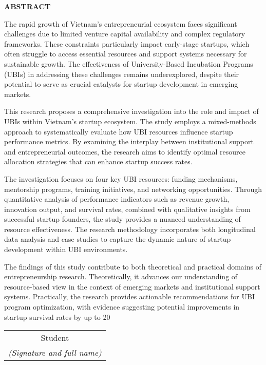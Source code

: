\documentclass[../DoAn.tex]{subfiles}
\begin{document}
	\begin{center}
		\Large{\textbf{ABSTRACT}}\\
	\end{center}
	\vspace{1cm}
	The rapid growth of Vietnam's entrepreneurial ecosystem faces significant challenges due to limited venture capital availability and complex regulatory frameworks. These constraints particularly impact early-stage startups, which often struggle to access essential resources and support systems necessary for sustainable growth. The effectiveness of University-Based Incubation Programs (UBIs) in addressing these challenges remains underexplored, despite their potential to serve as crucial catalysts for startup development in emerging markets.

	This research proposes a comprehensive investigation into the role and impact of UBIs within Vietnam's startup ecosystem. The study employs a mixed-methods approach to systematically evaluate how UBI resources influence startup performance metrics. By examining the interplay between institutional support and entrepreneurial outcomes, the research aims to identify optimal resource allocation strategies that can enhance startup success rates.

	The investigation focuses on four key UBI resources: funding mechanisms, mentorship programs, training initiatives, and networking opportunities. Through quantitative analysis of performance indicators such as revenue growth, innovation output, and survival rates, combined with qualitative insights from successful startup founders, the study provides a nuanced understanding of resource effectiveness. The research methodology incorporates both longitudinal data analysis and case studies to capture the dynamic nature of startup development within UBI environments.

	The findings of this study contribute to both theoretical and practical domains of entrepreneurship research. Theoretically, it advances our understanding of resource-based view in the context of emerging markets and institutional support systems. Practically, the research provides actionable recommendations for UBI program optimization, with evidence suggesting potential improvements in startup survival rates by up to 20%
	\begin{flushright}
		\begin{tabular}{@{}c@{}}
			Student                            \\
			\textit{(Signature and full name)}
		\end{tabular}
	\end{flushright}
\end{document}
